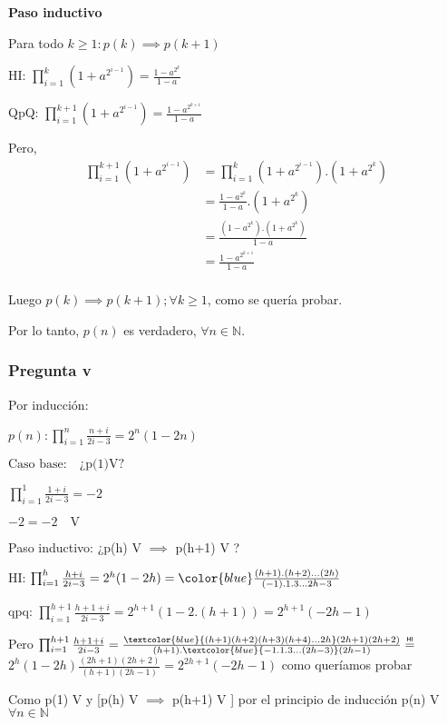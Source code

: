 \textbf{Paso inductivo}

Para todo $k \geq 1: p(k) \implies p(k+1)$

HI: $\prod_{i=1}^{k}\left(1+a^{2^{i-1}}\right)= \frac{1-a^{2^k}}{1-a}$

QpQ: $\prod_{i=1}^{k+1}\left(1+a^{2^{i-1}}\right)= \frac{1-a^{2^{k+1}}}{1-a}$

Pero,
\begin{align*}
    \prod_{i=1}^{k+1}\left(1+a^{2^{i-1}}\right) &= \prod_{i=1}^{k}\left(1+a^{2^{i-1}}\right) . (1+a^{2^k}) \\
    &= \frac{1-a^{2^k}}{1-a} . (1+a^{2^k}) \\
    &= \frac{\left(1-a^{2^k}\right).\left(1+a^{2^k}\right)}{1-a} \\
    &= \frac{1-a^{2^{k+1}}}{1-a} \\
\end{align*}

Luego $p(k) \implies p(k+1); \forall k \geq 1$, como se quería probar.

Por lo tanto, $p(n)$ es verdadero, $\forall n \in \mathbb{N}$.

\subsubsection{Pregunta v}
Por inducción:

$p(n): \prod_{i=1}^{n}\frac{n+i}{2i-3} = 2^n(1-2n) $

$\text{Caso base:}\quad \text{¿p(1)V?} $

$\prod_{i=1}^{1}\frac{1+i}{2i-3} = -2$

$-2=-2 \quad \text{V} $

Paso inductivo: ¿p(h) V $\implies$ p(h+1) V ? 

HI:  $ \prod_{i=1}^{ h}\frac{ h+i}{2i-3} = 2^ h(1-2 h) = \color{blue} \frac{(h+1).(h+2)\ldots(2h)}{(-1).1.3\ldots 2h-3}$

qpq:
$\prod_{i=1}^{  h+1}\frac{  h+1+i}{2i-3} = 2^{h+1}(1-2.(h+1))=2^{h+1}(-2h-1)$
\newcommand\eqHI{\mathrel{\overset{\makebox[0pt]{\mbox{\normalfont\tiny\sffamily HI}}}{=}}}

Pero $\prod_{i=1}^{  h+1}\frac{  h+1+i}{2i-3} = \frac{\textcolor{blue}{(h+1)(h+2)(h+3)(h+4)\ldots2h}(2h+1)(2h+2)}{(h+1).\textcolor{blue}{-1.1.3\ldots(2h-3)}(2h-1)} \eqHI$
$2^h(1-2h)\frac{(2h+1)(2h+2)}{(h+1)(2h-1)} = 2^{2h+1}(-2h-1)$ como queríamos probar

Como p(1) V y [p(h) V $\implies$ p(h+1) V ] por el principio de inducción p(n) V $\forall n \in \mathbb N$

